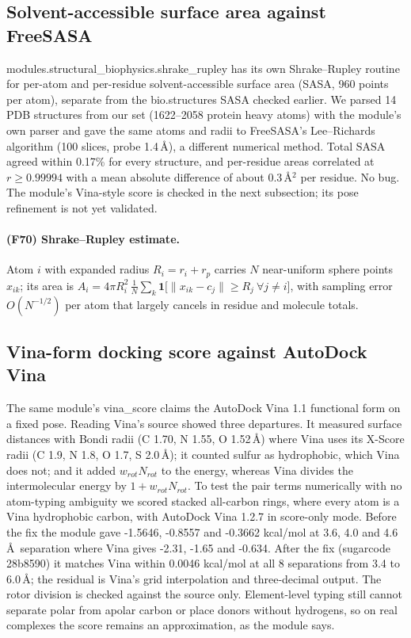 \subsection{Solvent-accessible surface area against FreeSASA}
modules.structural\_biophysics.shrake\_rupley has its own Shrake--Rupley routine for per-atom and per-residue solvent-accessible surface area (SASA, 960 points per atom), separate from the bio.structures SASA checked earlier. We parsed 14 PDB structures from our set (1622--2058 protein heavy atoms) with the module's own parser and gave the same atoms and radii to FreeSASA's Lee--Richards algorithm (100 slices, probe 1.4\,\AA), a different numerical method. Total SASA agreed within 0.17\% for every structure, and per-residue areas correlated at $r\ge0.99994$ with a mean absolute difference of about 0.3\,\AA$^2$ per residue. No bug. The module's Vina-style score is checked in the next subsection; its pose refinement is not yet validated.
\paragraph{(F70) Shrake--Rupley estimate.} Atom $i$ with expanded radius $R_i=r_i+r_p$ carries $N$ near-uniform sphere points $x_{ik}$; its area is $A_i=4\pi R_i^2\,\frac{1}{N}\sum_k\mathbf{1}\big[\lVert x_{ik}-c_j\rVert\ge R_j\ \forall j\ne i\big]$, with sampling error $O(N^{-1/2})$ per atom that largely cancels in residue and molecule totals.
\subsection{Vina-form docking score against AutoDock Vina}
The same module's vina\_score claims the AutoDock Vina 1.1 functional form on a fixed pose. Reading Vina's source showed three departures. It measured surface distances with Bondi radii (C 1.70, N 1.55, O 1.52\,\AA) where Vina uses its X-Score radii (C 1.9, N 1.8, O 1.7, S 2.0\,\AA); it counted sulfur as hydrophobic, which Vina does not; and it added $w_{rot}N_{rot}$ to the energy, whereas Vina divides the intermolecular energy by $1+w_{rot}N_{rot}$. To test the pair terms numerically with no atom-typing ambiguity we scored stacked all-carbon rings, where every atom is a Vina hydrophobic carbon, with AutoDock Vina 1.2.7 in score-only mode. Before the fix the module gave -1.5646, -0.8557 and -0.3662 kcal/mol at 3.6, 4.0 and 4.6\,\AA\ separation where Vina gives -2.31, -1.65 and -0.634. After the fix (sugarcode 28b8590) it matches Vina within 0.0046 kcal/mol at all 8 separations from 3.4 to 6.0\,\AA; the residual is Vina's grid interpolation and three-decimal output. The rotor division is checked against the source only. Element-level typing still cannot separate polar from apolar carbon or place donors without hydrogens, so on real complexes the score remains an approximation, as the module says.
